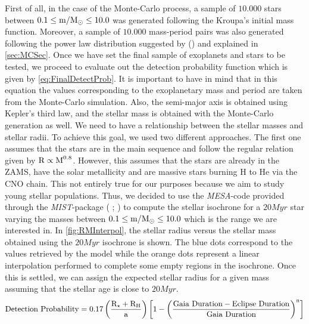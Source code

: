 First of all, in the case of the Monte-Carlo process, a sample of $10.000$ stars between $0.1 \leq \textnormal{m/M$_\odot$} \leq 10.0$ was generated following the Kroupa's initial mass function. Moreover, a sample of $10.000$ mass-period pairs was also generated following the power law distribution suggested by  (\citeyear{2010EAS....41..107N}) and explained in \autoref{sec:MCSec}. Once we have set the final sample of exoplanets and stars to be tested, we proceed to evaluate out the detection probability function which is given by \autoref{eq:FinalDetectProb}. It is important to have in mind that in this equation the values corresponding to the exoplanetary mass and period are taken from the Monte-Carlo simulation. Also, the semi-major axis is obtained using Kepler's third law, and the stellar mass is obtained with the Monte-Carlo generation as well. We need to have a relationship between the stellar masses and stellar radii. To achieve this goal, we used two different approaches. The first one assumes that the stars are in the main sequence and follow the regular relation given by $\textnormal{R} \propto \textnormal{M}^{0.8}$. However, this assumes that the stars are already in the ZAMS, have the solar metallicity and are massive stars burning H to He via the CNO chain. This not entirely true for our purposes because we aim to study young stellar populations. Thus, we decided to use the \textit{MESA}-code provided through the \textit{MIST}-package ( \citeyear{2016ApJS..222....8D};  \citeyear{2016ApJ...823..102C}) to compute the stellar isochrone for a $20Myr$ star varying the masses between $0.1 \leq \textnormal{m/M$_\odot$} \leq 10.0$ which is the range we are interested in. In \autoref{fig:RMInterpol}, the stellar radius versus the stellar mass obtained using the $20Myr$ isochrone is shown. The blue dots correspond to the values retrieved by the model while the orange dots represent a linear interpolation performed to complete some empty regions in the isochrone. Once this is settled, we can assign the expected stellar radius for a given mass assuming that the stellar age is close to $20Myr$.\\ 

\begingroup
\large
\begin{equation}
  \textnormal{Detection Probability} = 0.17 \left(\frac{\textnormal{R}_\star + \textnormal{R}_\textnormal{H}}{\textnormal{a}} \right) \left[ 1 - \left( \frac{\textnormal{Gaia}~\textnormal{Duration} - \textnormal{Eclipse}~\textnormal{Duration}}{\textnormal{Gaia}~\textnormal{Duration}} \right)^\textnormal{n} \right]
 \label{eq:FinalDetectProb}
\end{equation}
\endgroup \\

